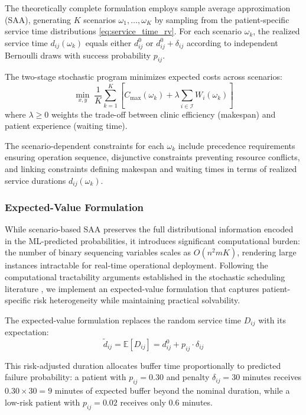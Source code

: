\documentclass[11pt,a4paper]{article}
\begin{document}
The theoretically complete formulation employs sample average approximation (SAA), generating $K$ scenarios $\omega_1, \ldots, \omega_K$ by sampling from the patient-specific service time distributions \eqref{eq:service_time_rv}. For each scenario $\omega_k$, the realized service time $d_{ij}(\omega_k)$ equals either $d_{ij}^0$ or $d_{ij}^0 + \delta_{ij}$ according to independent Bernoulli draws with success probability $p_{ij}$.

The two-stage stochastic program minimizes expected costs across scenarios:
\begin{equation}
\min_{x, y} \; \frac{1}{K} \sum_{k=1}^{K} \left[ C_{\max}(\omega_k) + \lambda \sum_{i \in \mathcal{I}} W_i(\omega_k) \right]
\label{eq:saa_objective}
\end{equation}
where $\lambda \geq 0$ weights the trade-off between clinic efficiency (makespan) and patient experience (waiting time).

The scenario-dependent constraints for each $\omega_k$ include precedence requirements ensuring operation sequence, disjunctive constraints preventing resource conflicts, and linking constraints defining makespan and waiting times in terms of realized service durations $d_{ij}(\omega_k)$.

\subsubsection{Expected-Value Formulation}

While scenario-based SAA preserves the full distributional information encoded in the ML-predicted probabilities, it introduces significant computational burden: the number of binary sequencing variables scales as $O(n^2 m K)$, rendering large instances intractable for real-time operational deployment. Following the computational tractability arguments established in the stochastic scheduling literature \citep{denton2003sequential, mancilla2012sample}, we implement an expected-value formulation that captures patient-specific risk heterogeneity while maintaining practical solvability.

The expected-value formulation replaces the random service time $D_{ij}$ with its expectation:
\begin{equation}
\tilde{d}_{ij} = \mathbb{E}[D_{ij}] = d_{ij}^0 + p_{ij} \cdot \delta_{ij}
\label{eq:expected_duration}
\end{equation}

This risk-adjusted duration allocates buffer time proportionally to predicted failure probability: a patient with $p_{ij} = 0.30$ and penalty $\delta_{ij} = 30$ minutes receives $0.30 \times 30 = 9$ minutes of expected buffer beyond the nominal duration, while a low-risk patient with $p_{ij} = 0.02$ receives only 0.6 minutes.
\end{document}
